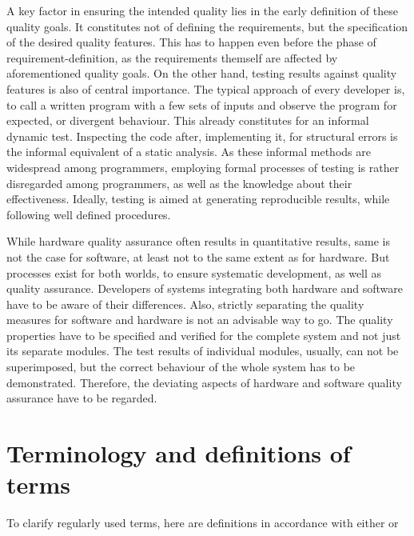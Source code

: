 A key factor in ensuring the intended quality lies in the early definition of these quality goals. It constitutes not of defining the requirements, but the specification of the desired quality features. This has to happen even before the phase of requirement-definition, as the requirements themself are affected by aforementioned quality goals. On the other hand, testing results against quality features is also of central importance. The typical approach of every developer is, to call a written program with a few sets of inputs and observe the program for expected, or divergent behaviour. This already constitutes for an informal dynamic test. Inspecting the code after, implementing it, for structural errors is the informal equivalent of a static analysis. As these informal methods are widespread among programmers, employing formal processes of testing is rather disregarded among programmers, as well as the knowledge about their effectiveness. Ideally, testing is aimed at generating reproducible results, while following well defined procedures.

While hardware quality assurance often results in quantitative results, same is not the case for software, at least not to the same extent as for hardware. But processes exist for both worlds, to ensure systematic development, as well as quality assurance. Developers of systems integrating both hardware and software have to be aware of their differences. Also, strictly separating the quality measures for software and hardware is not an advisable way to go. The quality properties have to be specified and verified for the complete system and not just its separate modules. The test results of individual modules, usually, can not be superimposed, but the correct behaviour of the whole system has to be demonstrated. Therefore, the deviating aspects of hardware and software quality assurance have to be regarded.
	
	\section{Terminology and definitions of terms}
	To clarify regularly used terms, here are definitions in accordance with either \cite{Kopetz1997} or \cite{Liggesmeyer2002}
